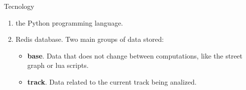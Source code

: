 \documentclass[10pt,letterpaper]{article}
\begin{document}
\begin{section}{Tecnology}

\begin{enumerate}
	\item the Python programming language.

	\item Redis database. Two main groups of data stored:
	\begin{itemize}
		\item \textbf{base}. Data that does not change between computations, like the street graph or lua scripts.
		\item \textbf{track}. Data related to the current track being analized.
	\end{itemize}
\end{enumerate}

\end{section}
\end{document}
